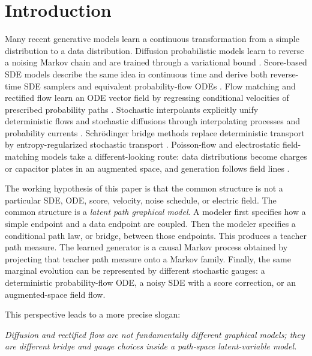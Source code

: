 \documentclass[twoside,11pt]{jmlr}
\numberwithin{equation}{section}
\begin{document}
\section{Introduction}

Many recent generative models learn a continuous transformation from a simple distribution to a data distribution. Diffusion probabilistic models learn to reverse a noising Markov chain and are trained through a variational bound \citep{sohldickstein2015nonequilibrium,ho2020ddpm,kingma2021vdm}. Score-based SDE models describe the same idea in continuous time and derive both reverse-time SDE samplers and equivalent probability-flow ODEs \citep{song2021score}. Flow matching and rectified flow learn an ODE vector field by regressing conditional velocities of prescribed probability paths \citep{lipman2023flow,liu2022rectified,tong2024cfm}. Stochastic interpolants explicitly unify deterministic flows and stochastic diffusions through interpolating processes and probability currents \citep{albergo2023flows,albergo2023stochastic}. Schr\"odinger bridge methods replace deterministic transport by entropy-regularized stochastic transport \citep{tong2024sf2m,shi2023dsbm}. Poisson-flow and electrostatic field-matching models take a different-looking route: data distributions become charges or capacitor plates in an augmented space, and generation follows field lines \citep{xu2022pfgm,xu2023pfgmpp,kolesov2025field,manukhov2025ifm,shlenskii2026duality}.

The working hypothesis of this paper is that the common structure is not a particular SDE, ODE, score, velocity, noise schedule, or electric field. The common structure is a \emph{latent path graphical model}. A modeler first specifies how a simple endpoint and a data endpoint are coupled. Then the modeler specifies a conditional path law, or bridge, between those endpoints. This produces a teacher path measure. The learned generator is a causal Markov process obtained by projecting that teacher path measure onto a Markov family. Finally, the same marginal evolution can be represented by different stochastic gauges: a deterministic probability-flow ODE, a noisy SDE with a score correction, or an augmented-space field flow.

This perspective leads to a more precise slogan:
\begin{center}
\emph{Diffusion and rectified flow are not fundamentally different graphical models; they are different bridge and gauge choices inside a path-space latent-variable model.}
\end{center}
\end{document}
